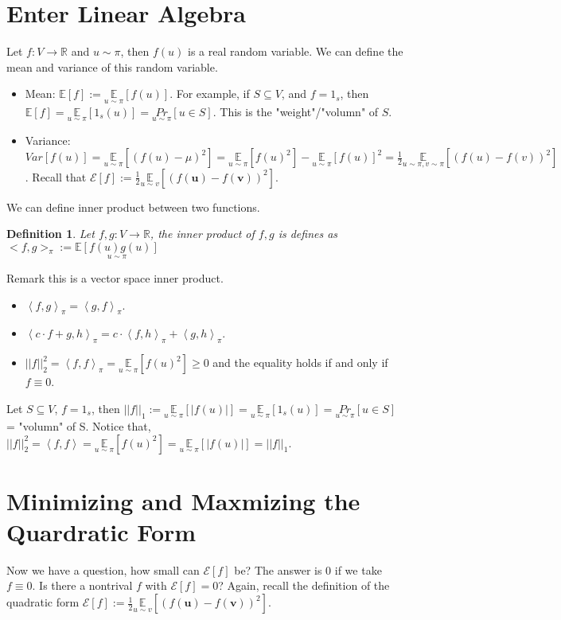 \documentclass{article}
\newtheorem{definition}[theorem]{Definition}
\begin{document}
\section{Enter Linear Algebra}
Let $f:V \rightarrow \mathbb{R}$ and $u \sim \pi$, then $f(u)$ is a real random variable. We can define the mean and variance of this random variable.
\begin{itemize}
  \item Mean: $\mathbb{E}[f] := \underset{u \sim \pi}{\mathbb{E}} [f(u)]$. For example, if $S \subseteq V$, and $f = 1_s$, then $\mathbb{E}[f] = \underset{u \sim \pi}{\mathbb{E}} [1_s(u)] = \underset{u \sim \pi}{Pr}[u \in S]$. This is the "weight"/"volumn" of $S$.
  \item Variance: $Var[f(u)] = \underset{u \sim \pi}{\mathbb{E}} [(f(u)-\mu)^2] = \underset{u \sim \pi}{\mathbb{E}} [f(u)^2] - \underset{u \sim \pi}{\mathbb{E}} [f(u)]^2 = \frac{1}{2} \underset{u \sim \pi, v \sim \pi}{\mathbb{E}} [(f(u)-f(v))^2]$. Recall that $\mathcal{E}[f]:=\frac{1}{2} \underset{u \sim v}{\mathbb{E}}\left[(f(\boldsymbol{u})-f(\boldsymbol{v}))^{2}\right]$.
\end{itemize}
We can define inner product between two functions.
\begin{definition}
  Let $f, g: V \rightarrow \mathbb{R}$, the inner product of $f, g$ is defines as $<f,g>_\pi := \underset{u \sim \pi}{\mathbb{E}[f(u)g(u)]}$
\end{definition}
Remark this is a vector space inner product.
\begin{itemize}
  \item $\left< f,g \right>_\pi = \left<g,f \right>_\pi$.
  \item $\left< c \cdot f+g,h \right>_\pi = c \cdot \left< f,h \right>_\pi + \left<g,h \right>_\pi$.
  \item $||f||_{2}^{2} = \left< f,f \right>_\pi = \underset{u \sim \pi}{\mathbb{E}}[f(u)^2] \geq 0$ and the equality holds if and only if $f \equiv 0$.
\end{itemize}
Let $S \subseteq V$, $f = 1_s$, then $||f||_1 := \underset{u \sim \pi}{\mathbb{E}}[|f(u)|] = \underset{u \sim \pi}{\mathbb{E}}[1_s(u)] = \underset{u \sim \pi}{Pr}[u \in S]$ = "volumn" of S. Notice that, $||f||_2^2 = \left<f,f \right> = \underset{u \sim \pi}{\mathbb{E}}[f(u)^2] = \underset{u \sim \pi}{\mathbb{E}}[|f(u)|] = ||f||_1$.

\section{Minimizing and Maxmizing the Quardratic Form}
Now we have a question, how small can $\mathcal{E}[f]$ be? The answer is $0$ if we take $f \equiv 0$. Is there a nontrival $f$ with $\mathcal{E}[f] = 0$? Again, recall the definition of the quadratic form $\mathcal{E}[f]:=\frac{1}{2} \underset{u \sim v}{\mathbb{E}}\left[(f(\boldsymbol{u})-f(\boldsymbol{v}))^{2}\right]$.
\end{document}
